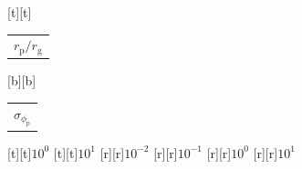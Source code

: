 %    
%
%
\begin{psfrags}%
\psfragscanon%
%
[t][t]{\color[rgb]{0,0,0}\setlength{\tabcolsep}{0pt}\begin{tabular}{c}{\Large$r_\mathrm{p}/r_\mathrm{g}$}\end{tabular}}%
[b][b]{\color[rgb]{0,0,0}\setlength{\tabcolsep}{0pt}\begin{tabular}{c}{\Large$\sigma_{\phi_\mathrm{p}}$}\end{tabular}}%
%
[t][t]{$10^{0}$}%
[t][t]{$10^{1}$}%
%
[r][r]{$10^{-2}$}%
[r][r]{$10^{-1}$}%
[r][r]{$10^{0}$}%
[r][r]{$10^{1}$}%
%
%
\end{psfrags}%
%
